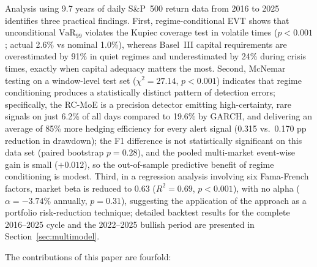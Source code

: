 \documentclass[]{interact}
\begin{document}
Analysis using 9.7 years of daily S\&P~500 return
data from 2016 to 2025 identifies three practical findings.
First, regime-conditional EVT shows that unconditional
$\text{VaR}_{99}$ violates the Kupiec coverage test in volatile times
($p < 0.001$; actual 2.6\% vs nominal 1.0\%), whereas
Basel~III capital requirements are overestimated by 91\%
in quiet regimes and underestimated by 24\% during
crisis times, exactly when capital adequacy matters the
most. Second, McNemar testing on a window-level test set ($\chi^2 = 27.14$, $p < 0.001$) indicates that regime conditioning produces a statistically distinct pattern of detection errors; specifically, the
RC-MoE is a precision detector emitting high-certainty,
rare signals on just 6.2\% of all days compared to 19.6\%
by GARCH, and delivering an average of 85\% more hedging
efficiency for every alert signal (0.315 vs.\ 0.170 pp reduction
in drawdown); the F1 difference is not statistically significant on this data set (paired bootstrap $p = 0.28$), and the pooled multi-market event-wise gain is small ($+0.012$), so the out-of-sample predictive benefit of regime conditioning is modest. Third, in a regression analysis involving
six Fama-French factors, market beta is reduced to 0.63
($R^2 = 0.69$, $p < 0.001$), with no alpha ($\alpha = -3.74\%$
annually, $p = 0.31$), suggesting the application of the
approach as a portfolio risk-reduction technique; detailed
backtest results for the complete 2016--2025 cycle and
the 2022--2025 bullish period are presented in Section~\ref{sec:multimodel}.

The contributions of this paper are fourfold:
\end{document}
